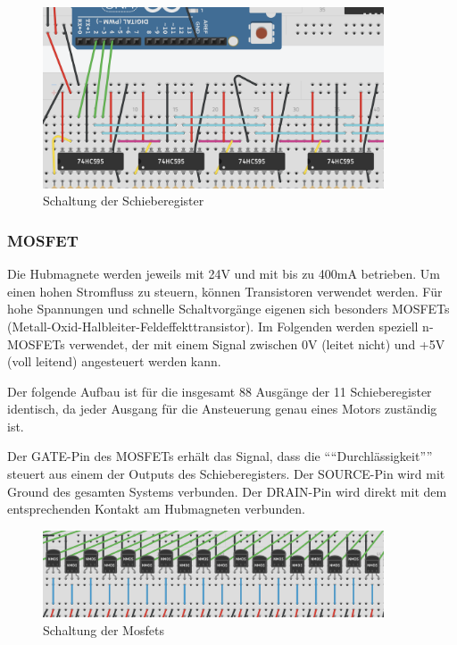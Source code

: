 \begin{figure}[htbp]
	\centering
	\includegraphics[width=0.9\textwidth]{img/SchaltungSchieberegister}
	\caption{Schaltung der Schieberegister}
	\label{fig:Shifting}
\end{figure}

\subsubsection{MOSFET}

Die Hubmagnete werden jeweils mit 24V und mit bis zu 400mA betrieben.
Um einen hohen Stromfluss zu steuern, können Transistoren verwendet werden.
Für hohe Spannungen und schnelle Schaltvorgänge eigenen sich besonders MOSFETs (Metall-Oxid-Halbleiter-Feldeffekttransistor).
Im Folgenden werden speziell n-MOSFETs verwendet, der mit einem Signal zwischen 0V (leitet nicht) und +5V (voll leitend) angesteuert werden kann.

Der folgende Aufbau ist für die insgesamt 88 Ausgänge der 11 Schieberegister identisch, da jeder Ausgang für die Ansteuerung genau eines Motors zuständig ist.

Der GATE-Pin des MOSFETs erhält das Signal, dass die \enquote{``Durchlässigkeit''} steuert aus einem der Outputs des Schieberegisters.
Der SOURCE-Pin wird mit Ground des gesamten Systems verbunden.
Der DRAIN-Pin wird direkt mit dem entsprechenden Kontakt am Hubmagneten verbunden.

\begin{figure}[htbp]
	\centering
	\includegraphics[width=0.9\textwidth]{img/MosSchaltung}
	\caption{Schaltung der Mosfets}
	\label{fig:SchaltungMosfet}
\end{figure}

